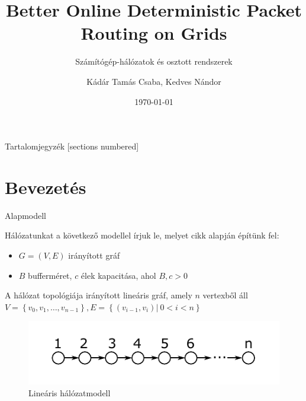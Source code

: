 \documentclass[10pt]{beamer}
\title{Better Online Deterministic Packet Routing on Grids}
\subtitle{Számítógép-hálózatok és osztott rendszerek}
\date{\today}
\author{Kádár Tamás Csaba, Kedves Nándor}
\begin{document}
\maketitle

\begin{frame}{Tartalomjegyzék}
  [sections numbered]
  \tableofcontents[hideallsubsections]
\end{frame}

\section{Bevezetés}

\begin{frame}[fragile]{Alapmodell}

  Hálózatunkat a következő modellel írjuk le, melyet \cite{even2015better} cikk alapján építünk fel:
  \begin{itemize}
  	\item $ G = \left( V, E \right) $ irányított gráf
  	\item $ B $ bufferméret, $ c $ élek kapacitása, ahol $ B, c > 0 $
  \end{itemize}

  A hálózat topológiája irányított lineáris gráf, amely $ n $ vertexből áll $ V = \left\lbrace v_0, v_1,\dots,v_{n-1} \right\rbrace, E = \left\lbrace \left( v_{i-1}, v_i \right) | \ 0 < i < n \right\rbrace $

  \begin{figure}[c]
  	\centering \includegraphics[width=1\columnwidth]{Image/linear_network}
  	\caption{\label{fig:linear_network}Lineáris hálózatmodell}
  \end{figure}

\end{frame}
\end{document}
